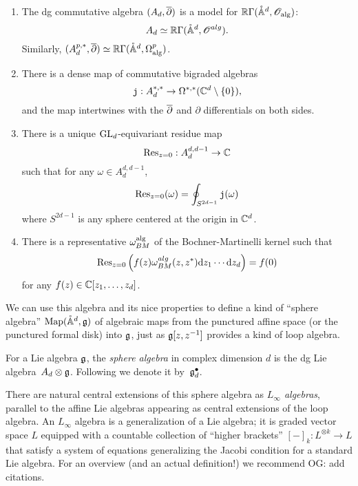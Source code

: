 \documentclass[11pt]{amsart}
\def\pAA{\mathring{\AA}}
\def\jou{{\mathtt{j}}}
\def\owen#1{{\textcolor{violet!65!black}{OG: {#1}}}}
\begin{document}
\begin{prop}
\label{prop: Ad} $\;$
\begin{enumerate}
\item
The dg commutative algebra $(A_d,{\overline{\partial}})$ is a model for $\RR \Gamma(\pAA^d, \sO_{\rm alg})$:
\[
A_d \simeq \RR\Gamma(\pAA^{d}, \sO^{alg}) .
\]
Similarly, $(A_d^{p,*},\dbar) \simeq \RR \Gamma(\pAA^{d}, \Omega^{p}_{\rm alg})$.
\item There is a dense map of commutative bigraded algebras
\[
\jou : A^{*,*}_d \to \Omega^{*,*}(\CC^d \setminus \{0\}),
\]
and the map intertwines with the ${\overline{\partial}}$ and $\partial$ differentials on both sides.
\item There is a unique ${\rm GL}_d$-equivariant residue map
\[
{\rm Res}_{z=0} : A_d^{d,d-1} \to \mathbb C
\]
such that for any $\omega \in A^{d,d-1}_d$,
\[
{\rm Res}_{z=0} (\omega) = \oint_{S^{2d-1}} \jou(\omega)
\]
where $S^{2d-1}$ is any sphere centered at the origin in $\mathbb C^d$. 
\item There is a representative $\omega_{BM}^{\rm alg}$ of the Bochner-Martinelli kernel such that
\[
{\rm Res}_{z=0} \left(f(z) \omega_{BM}^{alg}(z,z^*) {\rm d} z_1 \cdots {\rm d} z_d\right) = f(0)
\]
for any $f (z) \in \mathbb C[z_1,\ldots,z_d]$. 
\end{enumerate}
\end{prop}

We can use this algebra and its nice properties to define a kind of ``sphere algebra'' $\Map(\pAA^d,\fg)$ of algebraic maps from the punctured affine space (or the punctured formal disk) into $\mathfrak g$,
just as $\mathfrak g[z,z^{-1}]$ provides a kind of loop algebra.

\begin{dfn}
For a Lie algebra $\mathfrak g$, the {\em sphere algebra} in complex dimension $d$ is the dg Lie algebra~$A_d \otimes \mathfrak g$.
Following \cite{FHK} we denote it by~$\mathfrak g^\bullet_d$.
\end{dfn}

There are natural central extensions of this sphere algebra as {\em $L_\infty$ algebras},
parallel to the affine Lie algebras appearing as central extensions of the loop algebra.
An $L_\infty$ algebra is a generalization of a Lie algebra;
it is graded vector space $L$ equipped with a countable collection of ``higher brackets'' $[-]_k: L^{\otimes k} \to L$ that satisfy a system of equations generalizing the Jacobi condition for a standard Lie algebra.
For an overview (and an actual definition!) we recommend \owen{add citations}.
\end{document}
